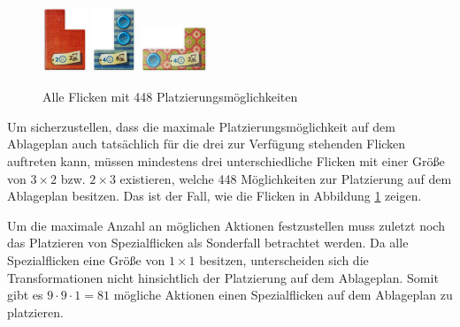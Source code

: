 \begin{figure}
    \centering
    \includegraphics[width=0.12\textwidth]{res/pictures/assets/08_front.png}

    \includegraphics[width=0.12\textwidth]{res/pictures/assets/14_front.png}

    \includegraphics[width=0.18\textwidth]{res/pictures/assets/19_front.png}
    \caption[Alle Flicken mit 448 Platzierungsmöglichkeiten]{\unskip}
    Alle Flicken mit 448 Platzierungsmöglichkeiten
    \label{fig:flicken-mit-448}
\end{figure}

Um sicherzustellen, dass die maximale Platzierungsmöglichkeit auf dem Ablageplan auch tatsächlich für die drei zur Verfügung stehenden Flicken auftreten kann, müssen mindestens drei unterschiedliche Flicken mit einer Größe von $3 \times 2$ bzw. $2 \times 3$ existieren, welche 448 Möglichkeiten zur Platzierung auf dem Ablageplan besitzen. Das ist der Fall, wie die Flicken in Abbildung \ref{fig:flicken-mit-448} zeigen.

Um die maximale Anzahl an möglichen Aktionen festzustellen muss zuletzt noch das Platzieren von Spezialflicken als Sonderfall betrachtet werden. Da alle Spezialflicken eine Größe von $1 \times 1$ besitzen, unterscheiden sich die Transformationen nicht hinsichtlich der Platzierung auf dem Ablageplan. Somit gibt es $9 \cdot 9 \cdot 1 = 81$ mögliche Aktionen einen Spezialflicken auf dem Ablageplan zu platzieren.

